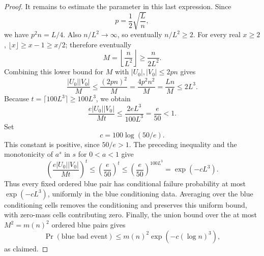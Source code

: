 \begin{proof}
It remains to estimate the parameter in this last expression.  Since
\[
p=\frac12\sqrt{\frac{L}{n}},
\]
we have \(p^2n=L/4\).  Also \(n/L^2\to\infty\), so eventually
\(n/L^2\ge2\).  For every real \(x\ge2\), \(\lfloor x\rfloor\ge x-1\ge x/2\);
therefore eventually
\[
  M=\left\lfloor\frac{n}{L^2}\right\rfloor
    \ge \frac{n}{2L^2}.
\]
Combining this lower bound for \(M\) with \(|U_0|,|V_0|\le2pn\) gives
\[
  \frac{|U_0||V_0|}{M}
    \le \frac{(2pn)^2}{M}
    =\frac{4p^2n^2}{M}
    =\frac{Ln}{M}
    \le 2L^3 .
\]
Because \(t=\lceil100L^3\rceil\ge100L^3\), we obtain
\[
  \frac{e|U_0||V_0|}{Mt}
    \le \frac{2eL^3}{100L^3}
    =\frac e{50}<1 .
\]
Set
\[
  c=100\log(50/e).
\]
This constant is positive, since \(50/e>1\).  The preceding inequality and
the monotonicity of \(a^s\) in \(s\) for \(0<a<1\) give
\[
\left(\frac{e|U_0||V_0|}{Mt}\right)^t
  \le \left(\frac e{50}\right)^t
  \le \left(\frac e{50}\right)^{100L^3}
  = \exp(-cL^3).
\]
Thus every fixed ordered blue pair has conditional failure probability at
most \(\exp(-cL^3)\), uniformly in the blue conditioning data.  Averaging over
the blue conditioning cells removes the conditioning and preserves this
uniform bound, with zero-mass cells contributing zero.  Finally, the union
bound over the at most \(M^2=m(n)^2\) ordered blue pairs gives
\[
  \Pr(\text{blue bad event})
    \le m(n)^2\exp(-c(\log n)^3),
\]
as claimed.
\end{proof}
